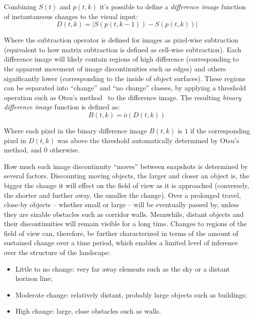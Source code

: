 \documentclass[twocolumn, 9pt,fleqn]{jsproceedings}
\begin{document}
Combining $S(t)$ and $p(t, k)$ it's possible to define a \textit{difference image} function of instantaneous changes to the visual input:
\begin{equation}
D(t, k) = | S(p(t, k-1)) - S(p(t, k)) |
\end{equation}

Where the subtraction operator is defined for images as pixel-wise subtraction (equivalent to how matrix subtraction is defined as cell-wise subtraction). Each difference image will likely contain regions of high difference (corresponding to the apparent movement of image discontinuities such as edges) and others significantly lower (corresponding to the inside of object surfaces). These regions can be separated into ``change'' and ``no change'' classes, by applying a threshold operation such as Otsu's method~\cite{OTS79} to the difference image. The resulting \textit{binary difference image} function is defined as:
\begin{equation}
B(t, k) = \bar{o}(D(t, k))
\end{equation}

Where each pixel in the binary difference image $B(t, k)$ is $1$ if the corresponding pixel in $D(t, k)$ was above the threshold automatically determined by Otsu's method, and $0$ otherwise.

How much each image discontinuity ``moves'' between snapshots is determined by several factors. Discounting moving objects, the larger and closer an object is, the bigger the change it will effect on the field of view as it is approached (conversely, the shorter and further away, the smaller the change). Over a prolonged travel, close-by objects -- whether small or large -- will be eventually passed by, unless they are sizable obstacles such as corridor walls. Meanwhile, distant objects and their discontinuities will remain visible for a long time. Changes to regions of the field of view can, therefore, be further characterized in terms of the amount of sustained change over a time period, which enables a limited level of inference over the structure of the landscape:

\begin{itemize}
\item Little to no change: very far away elements such as the sky or a distant horizon line;
\item Moderate change: relatively distant, probably large objects such as buildings;
\item High change: large, close obstacles such as walls.
\end{itemize}
\end{document}
